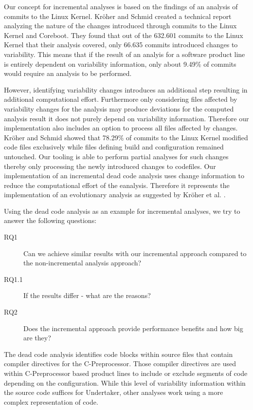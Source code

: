 \documentclass[a4paper]{article}
\begin{document}
Our concept for incremental analyses is based on the findings of an analysis of commits to the Linux Kernel. Kr\"oher and Schmid \cite{ComAn} created a technical report analyzing the nature of the changes introduced through commits to the Linux Kernel and Coreboot. They found that out of the 632.601 commits to the Linux Kernel that their analysis covered, only 66.635 commits introduced changes to variability. This means that if the result of an analyis for a software product line is entirely dependent on variability information, only about 9.49\% of commits would require an analysis to be performed. 

However, identifying variability changes introduces an additional step resulting in additional computational effort. Furthermore only considering files affected by variability changes for the analysis may produce deviations for the computed analysis result it does not purely depend on variability information. Therefore our implementation also includes an option to process all files affected by changes.  Kr\"oher and Schmid \cite{ComAn} showed that 78.29\% of commits to the Linux Kernel modified code files exclusively while files defining build and configuration remained untouched. Our tooling is able to perform partial analyses for such changes thereby only processing the newly introduced changes to codefiles.  Our implementation of an incremental dead code analysis uses change information to reduce the computational effort of the eanalysis. Therefore it represents the implementation of an evolutionary analysis as suggested by Kr\"oher et al. \cite{ComAn-splc}. 

Using the dead code analysis as an example for incremental analyses, we try to answer the following questions: 

\begin{description}
	\item[RQ1] Can we achieve similar results with our incremental approach compared to the non-incremental analysis approach?
	\item[RQ1.1] If the results differ - what are the reasons?
	\item[RQ2] Does the incremental approach provide performance benefits and how big are they?
\end{description} 

The dead code analysis identifies code blocks within source files that contain compiler directives for the C-Preprocessor. Those compiler directives are used within C-Preprocessor based product lines to include or exclude segments of code depending on the configuration. While this level of variability information within the source code suffices for Undertaker, other analyses work using a more complex representation of code. 
\end{document}
